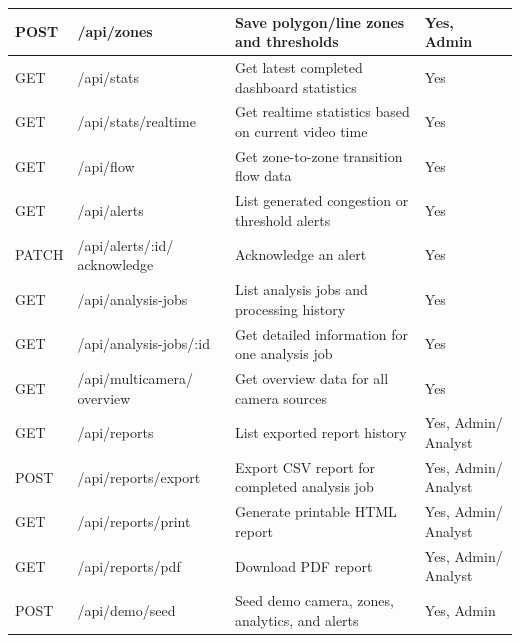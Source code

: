 \documentclass[12pt,a4paper]{report}
\begin{document}
\begin{longtable}{|p{2.5cm}|p{4.2cm}|p{5.2cm}|p{3cm}|}
\hline
POST & /api/zones & Save polygon/line zones and thresholds & Yes, Admin \\
\hline
GET & /api/stats & Get latest completed dashboard statistics & Yes \\
\hline
GET & /api/stats/realtime & Get realtime statistics based on current video time & Yes \\
\hline
GET & /api/flow & Get zone-to-zone transition flow data & Yes \\
\hline
GET & /api/alerts & List generated congestion or threshold alerts & Yes \\
\hline
PATCH & /api/alerts/:id/ acknowledge & Acknowledge an alert & Yes \\
\hline
GET & /api/analysis-jobs & List analysis jobs and processing history & Yes \\
\hline
GET & /api/analysis-jobs/:id & Get detailed information for one analysis job & Yes \\
\hline
GET & /api/multicamera/ overview & Get overview data for all camera sources & Yes \\
\hline
GET & /api/reports & List exported report history & Yes, Admin/ Analyst \\
\hline
POST & /api/reports/export & Export CSV report for completed analysis job & Yes, Admin/ Analyst \\
\hline
GET & /api/reports/print & Generate printable HTML report & Yes, Admin/ Analyst \\
\hline
GET & /api/reports/pdf & Download PDF report & Yes, Admin/ Analyst \\
\hline
POST & /api/demo/seed & Seed demo camera, zones, analytics, and alerts & Yes, Admin \\
\hline
\end{longtable}
\end{document}
